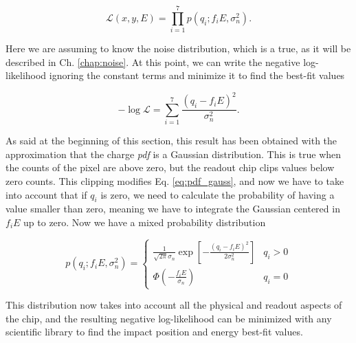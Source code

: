 \begin{equation}
\mathcal{L}(x, y, E) = \prod_{i=1}^7 p(q_i; f_iE, \sigma_n^2).
\end{equation}

Here we are assuming to know the noise distribution, which is a true, as it will be described in Ch. \ref{chap:noise}. At this point, we can write the negative log-likelihood ignoring the constant terms and minimize it to find the best-fit values

\begin{equation}
- \log \mathcal{L} = \sum_{i=1}^7 \frac{(q_i - f_iE)^2}{\sigma_n^2}.
\end{equation}

As said at the beginning of this section, this result has been obtained with the approximation that the charge \textit{pdf} is a Gaussian distribution. This is true when the counts of the pixel are above zero, but the readout chip clips values below zero counts. This clipping modifies Eq. \ref{eq:pdf_gauss}, and now we have to take into account that if $q_i$ is zero, we need to calculate the probability of having a value smaller than zero, meaning we have to integrate the Gaussian centered in $f_i E$ up to zero. Now we have a mixed probability distribution

\begin{equation}
p(q_i; f_i E , \sigma^2_n) = 
\begin{cases}
\frac{1}{\sqrt{2\pi}\sigma_n} \exp \left[- \frac{(q_i - f_i E)^2}{2\sigma_n^2}\right] & q_i > 0\\
\Phi \left(- \frac{f_iE}{\sigma_n} \right) & q_i = 0
\end{cases}
\end{equation}

This distribution now takes into account all the physical and readout aspects of the chip, and the resulting negative log-likelihood can be minimized with any scientific library to find the impact position and energy best-fit values.

